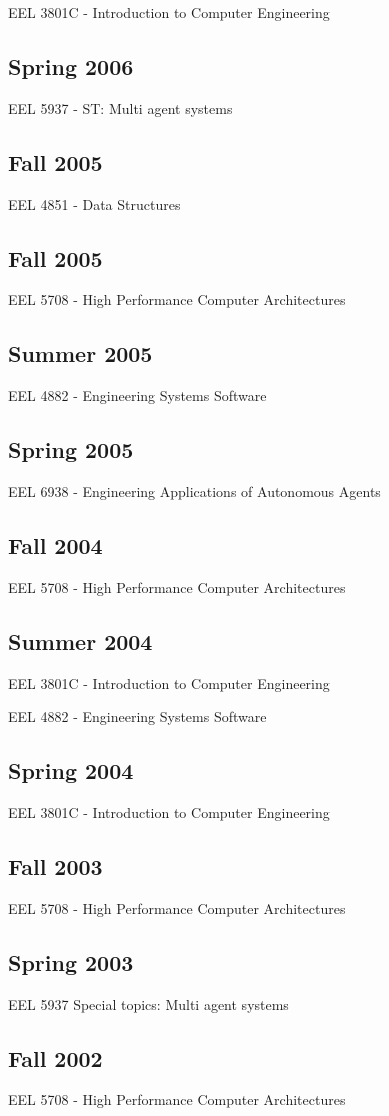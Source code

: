 EEL 3801C - Introduction to Computer Engineering

\subsection*{Spring 2006}

EEL 5937 - ST: Multi agent systems

\subsection*{Fall 2005}

EEL 4851 - Data Structures

\subsection*{Fall 2005}

EEL 5708 - High Performance Computer Architectures

\subsection*{Summer 2005}

EEL 4882 - Engineering Systems Software

\subsection*{Spring 2005}

EEL 6938 - Engineering Applications of Autonomous Agents

\subsection*{Fall 2004}

EEL 5708 - High Performance Computer Architectures

\subsection*{Summer 2004}

EEL 3801C - Introduction to Computer Engineering

EEL 4882 - Engineering Systems Software

\subsection*{Spring 2004}

EEL 3801C - Introduction to Computer Engineering

\subsection*{Fall 2003}

EEL 5708 - High Performance Computer Architectures

\subsection*{Spring 2003}

EEL 5937 Special topics: Multi agent systems

\subsection*{Fall 2002}

EEL 5708 - High Performance Computer Architectures
